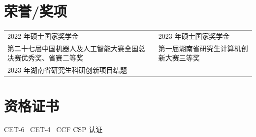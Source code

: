 \documentclass{resume}
\begin{document}
\section{荣誉/奖项}
{\small
\begin{tabular}{@{}p{} p{}@{}}
2022 年硕士国家奖学金 & 2023 年硕士国家奖学金 \\
第二十七届中国机器人及人工智能大赛全国总决赛优秀奖、省赛二等奖 & 第一届湖南省研究生计算机创新大赛三等奖 \\
2023 年湖南省研究生科研创新项目结题 \\
\end{tabular}
}

\section{资格证书}
CET-6 \textperiodcentered\ CET-4 \textperiodcentered\ CCF CSP 认证
\end{document}
